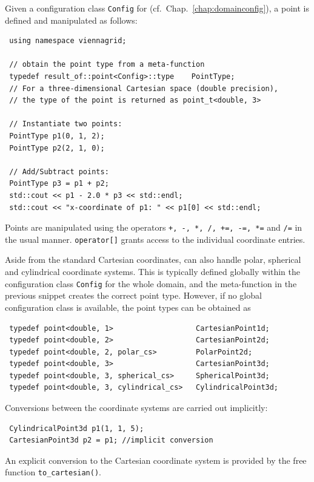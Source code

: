 Given a configuration class \lstinline|Config| for {\ViennaGrid} (cf.~Chap.~\ref{chap:domainconfig}), a point is defined and manipulated as follows:
\begin{lstlisting}
 using namespace viennagrid;

 // obtain the point type from a meta-function
 typedef result_of::point<Config>::type    PointType;
 // For a three-dimensional Cartesian space (double precision),
 // the type of the point is returned as point_t<double, 3>

 // Instantiate two points:
 PointType p1(0, 1, 2);
 PointType p2(2, 1, 0);

 // Add/Subtract points:
 PointType p3 = p1 + p2;
 std::cout << p1 - 2.0 * p3 << std::endl;
 std::cout << "x-coordinate of p1: " << p1[0] << std::endl;
\end{lstlisting}
Points are manipulated using the operators \lstinline|+, -, *, /, +=, -=, *=| and \lstinline|/=| in the usual manner. \lstinline|operator[]| grants access to the individual coordinate entries.

Aside from the standard Cartesian coordinates, {\ViennaGrid} can also handle polar, spherical and cylindrical coordinate systems.
This is typically defined globally within the configuration class \lstinline|Config| for the whole domain, and the meta-function in the previous snippet creates the correct point type. However, if no global configuration class is available, the point types can be obtained as
\begin{lstlisting}
 typedef point<double, 1>                   CartesianPoint1d;
 typedef point<double, 2>                   CartesianPoint2d;
 typedef point<double, 2, polar_cs>         PolarPoint2d;
 typedef point<double, 3>                   CartesianPoint3d;
 typedef point<double, 3, spherical_cs>     SphericalPoint3d;
 typedef point<double, 3, cylindrical_cs>   CylindricalPoint3d;
\end{lstlisting}
Conversions between the coordinate systems are carried out implicitly:
\begin{lstlisting}
 CylindricalPoint3d p1(1, 1, 5);
 CartesianPoint3d p2 = p1; //implicit conversion
\end{lstlisting}
An explicit conversion to the Cartesian coordinate system is provided by the free function \lstinline|to_cartesian()|.

